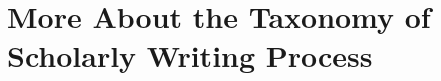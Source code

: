 









\section{More About the Taxonomy of Scholarly Writing Process} \label{sec:appendix:taxonomy}





